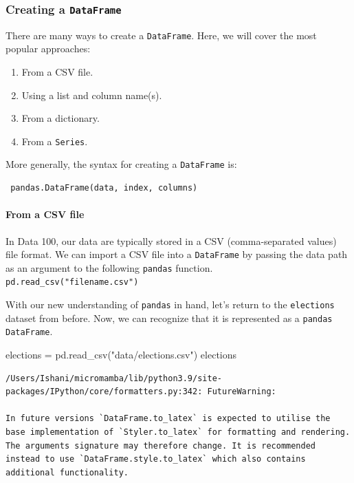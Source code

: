 \documentclass[
  letterpaper,
  DIV=11,
  numbers=noendperiod]{scrreprt}
\let\oldparagraph\paragraph
\renewcommand{\paragraph}[1]{\oldparagraph{#1}\mbox{}}
\newenvironment{Shaded}{\begin{snugshade}}{\end{snugshade}}
\newcommand{\NormalTok}[1]{\textcolor[rgb]{0.00,0.23,0.31}{#1}}
\newcommand{\OperatorTok}[1]{\textcolor[rgb]{0.37,0.37,0.37}{#1}}
\newcommand{\StringTok}[1]{\textcolor[rgb]{0.13,0.47,0.30}{#1}}
\providecommand{\tightlist}{%
  \setlength{\itemsep}{0pt}\setlength{\parskip}{0pt}}\usepackage{longtable,booktabs,array}
\begin{document}
\hypertarget{creating-a-dataframe}{%
\subsubsection{\texorpdfstring{Creating a
\texttt{DataFrame}}{Creating a DataFrame}}\label{creating-a-dataframe}}

There are many ways to create a \texttt{DataFrame}. Here, we will cover
the most popular approaches:

\begin{enumerate}
\def\labelenumi{\arabic{enumi}.}
\tightlist
\item
  From a CSV file.
\item
  Using a list and column name(s).
\item
  From a dictionary.
\item
  From a \texttt{Series}.
\end{enumerate}

More generally, the syntax for creating a \texttt{DataFrame} is:

\begin{verbatim}
 pandas.DataFrame(data, index, columns)
\end{verbatim}

\hypertarget{from-a-csv-file}{%
\paragraph{From a CSV file}\label{from-a-csv-file}}

In Data 100, our data are typically stored in a CSV (comma-separated
values) file format. We can import a CSV file into a \texttt{DataFrame}
by passing the data path as an argument to the following \texttt{pandas}
function.  \texttt{pd.read\_csv("filename.csv")}

With our new understanding of \texttt{pandas} in hand, let's return to
the \texttt{elections} dataset from before. Now, we can recognize that
it is represented as a \texttt{pandas} \texttt{DataFrame}.

\begin{Shaded}
\begin{Highlighting}[]
\NormalTok{elections }\OperatorTok{=}\NormalTok{ pd.read\_csv(}\StringTok{"data/elections.csv"}\NormalTok{)}
\NormalTok{elections}
\end{Highlighting}
\end{Shaded}

\begin{verbatim}
/Users/Ishani/micromamba/lib/python3.9/site-packages/IPython/core/formatters.py:342: FutureWarning:

In future versions `DataFrame.to_latex` is expected to utilise the base implementation of `Styler.to_latex` for formatting and rendering. The arguments signature may therefore change. It is recommended instead to use `DataFrame.style.to_latex` which also contains additional functionality.
\end{verbatim}
\end{document}
